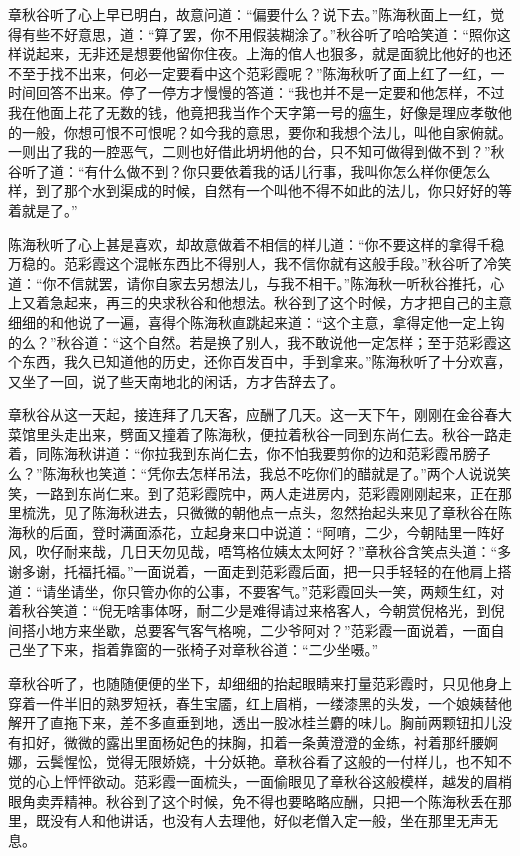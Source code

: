 \documentclass[12pt,UTF8]{ctexbook}
\begin{document}
{{{章秋谷听了心上早已明白，故意问道：“偏要什么？说下去。”陈海秋面上一红，觉得有些不好意思，道：“算了罢，你不用假装糊涂了。”秋谷听了哈哈笑道：“照你这样说起来，无非还是想要他留你住夜。上海的倌人也狠多，就是面貌比他好的也还不至于找不出来，何必一定要看中这个范彩霞呢？”陈海秋听了面上红了一红，一时间回答不出来。停了一停方才慢慢的答道：“我也并不是一定要和他怎样，不过我在他面上花了无数的钱，他竟把我当作个天字第一号的瘟生，好像是理应孝敬他的一般，你想可恨不可恨呢？如今我的意思，要你和我想个法儿，叫他自家俯就。一则出了我的一腔恶气，二则也好借此坍坍他的台，只不知可做得到做不到？”秋谷听了道：“有什么做不到？你只要依着我的话儿行事，我叫你怎么样你便怎么样，到了那个水到渠成的时候，自然有一个叫他不得不如此的法儿，你只好好的等着就是了。”

陈海秋听了心上甚是喜欢，却故意做着不相信的样儿道：“你不要这样的拿得千稳万稳的。范彩霞这个混帐东西比不得别人，我不信你就有这般手段。”秋谷听了冷笑道：“你不信就罢，请你自家去另想法儿，与我不相干。”陈海秋一听秋谷推托，心上又着急起来，再三的央求秋谷和他想法。秋谷到了这个时候，方才把自己的主意细细的和他说了一遍，喜得个陈海秋直跳起来道：“这个主意，拿得定他一定上钩的么？”秋谷道：“这个自然。若是换了别人，我不敢说他一定怎样；至于范彩霞这个东西，我久已知道他的历史，还你百发百中，手到拿来。”陈海秋听了十分欢喜，又坐了一回，说了些天南地北的闲话，方才告辞去了。

章秋谷从这一天起，接连拜了几天客，应酬了几天。这一天下午，刚刚在金谷春大菜馆里头走出来，劈面又撞着了陈海秋，便拉着秋谷一同到东尚仁去。秋谷一路走着，同陈海秋讲道：“你拉我到东尚仁去，你不怕我要剪你的边和范彩霞吊膀子么？”陈海秋也笑道：“凭你去怎样吊法，我总不吃你们的醋就是了。”两个人说说笑笑，一路到东尚仁来。到了范彩霞院中，两人走进房内，范彩霞刚刚起来，正在那里梳洗，见了陈海秋进去，只微微的朝他点一点头，忽然抬起头来见了章秋谷在陈海秋的后面，登时满面添花，立起身来口中说道：“阿唷，二少，今朝陆里一阵好风，吹仔耐来哉，几日天勿见哉，唔笃格位姨太太阿好？”章秋谷含笑点头道：“多谢多谢，托福托福。”一面说着，一面走到范彩霞后面，把一只手轻轻的在他肩上搭道：“请坐请坐，你只管办你的公事，不要客气。”范彩霞回头一笑，两颊生红，对着秋谷笑道：“倪无啥事体呀，耐二少是难得请过来格客人，今朝赏倪格光，到倪间搭小地方来坐歇，总要客气客气格啘，二少爷阿对？”范彩霞一面说着，一面自己坐了下来，指着靠窗的一张椅子对章秋谷道：“二少坐嗫。”

章秋谷听了，也随随便便的坐下，却细细的抬起眼睛来打量范彩霞时，只见他身上穿着一件半旧的熟罗短袄，春生宝靥，红上眉梢，一缕漆黑的头发，一个娘姨替他解开了直拖下来，差不多直垂到地，透出一股冰桂兰麝的味儿。胸前两颗钮扣儿没有扣好，微微的露出里面杨妃色的抹胸，扣着一条黄澄澄的金练，衬着那纤腰婀娜，云鬓惺忪，觉得无限娇娆，十分妖艳。章秋谷看了这般的一付样儿，也不知不觉的心上怦怦欲动。范彩霞一面梳头，一面偷眼见了章秋谷这般模样，越发的眉梢眼角卖弄精神。秋谷到了这个时候，免不得也要略略应酬，只把一个陈海秋丢在那里，既没有人和他讲话，也没有人去理他，好似老僧入定一般，坐在那里无声无息。

}}}
\end{document}
